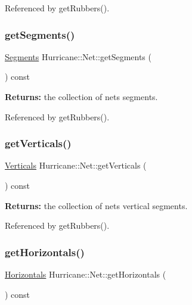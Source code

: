 Referenced by get\+Rubbers().

\mbox{\label{classHurricane_1_1Net_aadc5a9ef26d7a72f49fdf22452f3cc58}} 
\subsubsection{\texorpdfstring{get\+Segments()}{getSegments()}}
{\footnotesize\ttfamily \hyperlink{namespaceHurricane_a30748fa53a81cb597d4a13d651238716}{Segments} Hurricane\+::\+Net\+::get\+Segments (\begin{DoxyParamCaption}{ }\end{DoxyParamCaption}) const}

{\bfseries Returns\+:} the collection of net\textquotesingle{}s segments. 

Referenced by get\+Rubbers().

\mbox{\label{classHurricane_1_1Net_a97f32cf738af9cf107833ca81fe95db8}} 
\subsubsection{\texorpdfstring{get\+Verticals()}{getVerticals()}}
{\footnotesize\ttfamily \hyperlink{namespaceHurricane_a146e2d3d34b4035aff422f12e85345b9}{Verticals} Hurricane\+::\+Net\+::get\+Verticals (\begin{DoxyParamCaption}{ }\end{DoxyParamCaption}) const}

{\bfseries Returns\+:} the collection of net\textquotesingle{}s vertical segments. 

Referenced by get\+Rubbers().

\mbox{\label{classHurricane_1_1Net_ad8553af888909e1c127e12e68bd000fb}} 
\subsubsection{\texorpdfstring{get\+Horizontals()}{getHorizontals()}}
{\footnotesize\ttfamily \hyperlink{namespaceHurricane_a721e644c7d97f2f66049ab062140b855}{Horizontals} Hurricane\+::\+Net\+::get\+Horizontals (\begin{DoxyParamCaption}{ }\end{DoxyParamCaption}) const}


